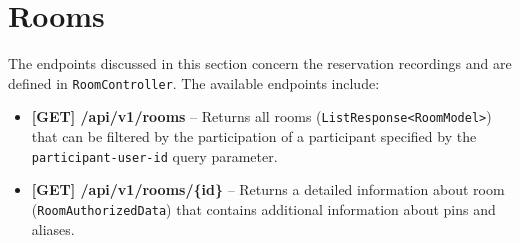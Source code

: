 \section{Rooms}
The endpoints discussed in this section concern the reservation recordings and are defined in \texttt{RoomController}.
The available endpoints include:
\begin{itemize}
    \item \textbf{[GET] /api/v1/rooms} -- Returns all rooms (\texttt{ListResponse<Room\-Model>}) that can be filtered by the participation of a participant specified by the \texttt{participant-user-id} query parameter.
    \item \textbf{[GET] /api/v1/rooms/\{id\}} -- Returns a detailed information about room (\texttt{RoomAuthorizedData}) that contains additional information about pins and aliases.
\end{itemize}
